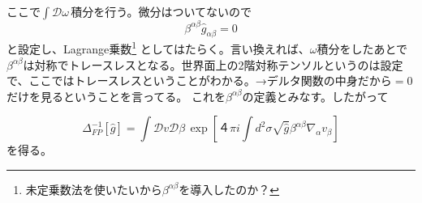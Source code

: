 \documentclass[10pt]{jsarticle}
\newcommand{\kkakko}[1]{\left[ #1 \right]} %
\newcommand{\sint}[1]{\int\mathcal{D}#1\,}%
\begin{document}
ここで$\sint{\omega}$積分を行う。微分はついてないので
\begin{equation}
  \beta^{\alpha\beta}\hat{g}_{\alpha\beta}=0
\end{equation}
と設定し、Lagrange乗数\footnote{未定乗数法を使いたいから$\beta^{\alpha\beta}$を導入したのか？}
としてはたらく。言い換えれば、$\omega$積分をしたあとで$\beta^{\alpha\beta}$は対称でトレースレスとなる。世界面上の2階対称テンソルというのは設定で、ここではトレースレスということがわかる。→デルタ関数の中身だから$=0$だけを見るということを言ってる。
これを$\beta^{\alpha\beta}$の定義とみなす。したがって

\begin{equation}
  \Delta^{-1}_{FP}[\hat{g}]=\int\mathcal{D}v\mathcal{D}\beta \,\exp \kkakko{４\pi i\int d^{2}\sigma \sqrt{\hat{g}}\beta^{\alpha\beta} \nabla_{\alpha}v_{\beta}}
\end{equation}
を得る。
\end{document}
